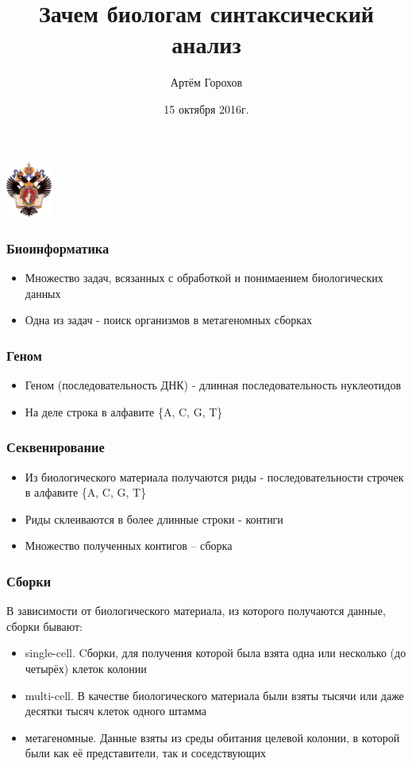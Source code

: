 \documentclass{beamer}
\title[]{Зачем биологам синтаксический анализ}
\institute[СПбГУ]{
    Санкт-Петербургский государственный университет \\
    Лаборатория языковых инструментов JetBrains}
\author[Артём Горохов]{Артём Горохов}
\date{15 октября 2016г.}
\begin{document}
    
    
    \begin{frame}
        \begin{center}
            {\includegraphics[width=1.5cm]{pictures/SPbGU_Logo.png}}
        \end{center}
        \titlepage
    \end{frame}
    
    \begin{frame}
    	\frametitle{Биоинформатика}
    	\begin{itemize}
		    \item Множество задач, всязанных с обработкой и понимаением биологических данных
    		\item Одна из задач - поиск организмов в метагеномных сборках
    	\end{itemize}
    \end{frame}

    \begin{frame}
        \frametitle{Геном}
        \begin{itemize}
            \item Геном (последовательность ДНК) - длинная последовательность нуклеотидов
            \item На деле строка в алфавите \{A, C, G, T\}
        \end{itemize}
    \end{frame}

    \begin{frame}
        \frametitle{Секвенирование}
        \begin{itemize}
            \item Из биологического материала получаются риды - последовательности строчек в алфавите \{A, C, G, T\}
            \item Риды склеиваются в более длинные строки - контиги
            \item Множество полученных контигов – сборка
        \end{itemize}
    \end{frame}

    \begin{frame}
        \frametitle{Сборки}
        В зависимости от биологического материала, из которого получаются данные, сборки
        бывают:
        \begin{itemize}
            \item single-cell. Cборки, для получения которой была взята одна или несколько
            (до четырёх) клеток колонии
            \item multi-cell. В качестве биологического материала были взяты тысячи или даже десятки тысяч клеток одного штамма
            \item метагеномные. Данные взяты из среды обитания целевой колонии, в которой были как её представители, так и соседствующих
        \end{itemize}
    \end{frame}
\end{document}
